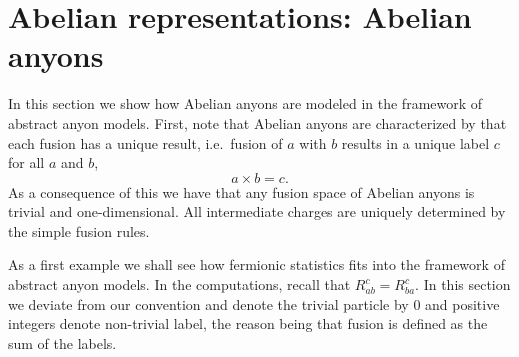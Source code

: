 \documentclass[a4paper,10pt,oneside]{book}
\theoremstyle{plain}
\theoremstyle{definition}
\theoremstyle{remark}
\begin{document}
\section{Abelian representations: Abelian anyons}

In this section we show how Abelian anyons are modeled in the framework of abstract anyon models. First, note that Abelian anyons are characterized by that each fusion has a unique result, i.e.\ fusion of $a$ with $b$ results in a unique label $c$ for all $a$ and $b$,
\begin{equation}
  a \times b = c.
\end{equation}
As a consequence of this we have that any fusion space of Abelian anyons is trivial and one-dimensional. All intermediate charges are uniquely determined by the simple fusion rules.

As a first example we shall see how fermionic statistics fits into the framework of abstract anyon models. In the computations, recall that $R_{ab}^c = R_{ba}^c$. In this section we deviate from our convention and denote the trivial particle by $0$ and positive integers denote non-trivial label, the reason being that fusion is defined as the sum of the labels.
\end{document}

